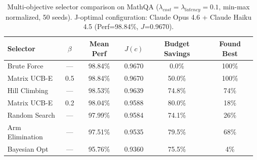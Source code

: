 \begin{table}[!htbp]
\centering
\small
\renewcommand{\arraystretch}{1.1}
\begin{tabular}{lccccc}
\toprule
\textbf{Selector} & \textbf{$\beta$} & \textbf{Mean Perf} & \textbf{$J(c)$} & \textbf{Budget Savings} & \textbf{Found Best} \\
\midrule
Brute Force & --- & 98.84\% & 0.9670 & 0.0\% & 100\% \\
\midrule
Matrix UCB-E & 0.5 & 98.84\% & 0.9670 & 50.0\% & 100\% \\
Hill Climbing & --- & 98.53\% & 0.9639 & 74.8\% & 74\% \\
Matrix UCB-E & 0.2 & 98.04\% & 0.9588 & 80.0\% & 18\% \\
Random Search & --- & 97.99\% & 0.9584 & 74.1\% & 26\% \\
Arm Elimination & --- & 97.51\% & 0.9535 & 79.5\% & 68\% \\
Bayesian Opt & --- & 95.76\% & 0.9360 & 75.5\% & 4\% \\
\bottomrule
\end{tabular}
\caption{Multi-objective selector comparison on MathQA ($\lambda_{cost}=\lambda_{latency}=0.1$, min-max normalized, 50 seeds). J-optimal configuration: Claude Opus 4.6 + Claude Haiku 4.5 (Perf=98.84\%, $J$=0.9670).}
\label{tab:multiobjective-mathqa}
\end{table}
